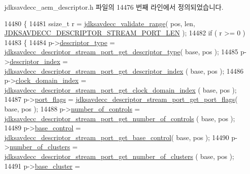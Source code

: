 jdksavdecc\+\_\+aem\+\_\+descriptor.\+h 파일의 14476 번째 라인에서 정의되었습니다.


\begin{DoxyCode}
14480 \{
14481     ssize\_t r = \hyperlink{group__util_ga9c02bdfe76c69163647c3196db7a73a1}{jdksavdecc\_validate\_range}( pos, len, 
      \hyperlink{group__descriptor__stream__port_ga1b3e49096f01beb5bfac0e22093adc0b}{JDKSAVDECC\_DESCRIPTOR\_STREAM\_PORT\_LEN} );
14482     \textcolor{keywordflow}{if} ( r >= 0 )
14483     \{
14484         p->\hyperlink{structjdksavdecc__descriptor__stream__port_ab7c32b6c7131c13d4ea3b7ee2f09b78d}{descriptor\_type} = 
      \hyperlink{group__descriptor__stream__port_ga9e5c5bfcfc4ac7f6ed5fbc306ae64397}{jdksavdecc\_descriptor\_stream\_port\_get\_descriptor\_type}(
       base, pos );
14485         p->\hyperlink{structjdksavdecc__descriptor__stream__port_a042bbc76d835b82d27c1932431ee38d4}{descriptor\_index} = 
      \hyperlink{group__descriptor__stream__port_ga7676ebd6ce26b6ef2d09bb93007f7c53}{jdksavdecc\_descriptor\_stream\_port\_get\_descriptor\_index}
      ( base, pos );
14486         p->\hyperlink{structjdksavdecc__descriptor__stream__port_a6608f023d147b556a49527d568abed8e}{clock\_domain\_index} = 
      \hyperlink{group__descriptor__stream__port_gaaf86a219e03309d42d2037bc17edd4bf}{jdksavdecc\_descriptor\_stream\_port\_get\_clock\_domain\_index}
      ( base, pos );
14487         p->\hyperlink{structjdksavdecc__descriptor__stream__port_a60a1f1704542df3b3f6e6db56622ddd9}{port\_flags} = 
      \hyperlink{group__descriptor__stream__port_ga95f34b2f9da40d90ee1b5b7fcda8403f}{jdksavdecc\_descriptor\_stream\_port\_get\_port\_flags}( base, pos
       );
14488         p->\hyperlink{structjdksavdecc__descriptor__stream__port_a0104bea638bdadf1a547c2b93813e22f}{number\_of\_controls} = 
      \hyperlink{group__descriptor__stream__port_ga125ba5e5a6d39ff2552d9289f5c44839}{jdksavdecc\_descriptor\_stream\_port\_get\_number\_of\_controls}
      ( base, pos );
14489         p->\hyperlink{structjdksavdecc__descriptor__stream__port_af06eac7dd98377a85258308e8a25e7f2}{base\_control} = 
      \hyperlink{group__descriptor__stream__port_ga75cb0d52e8f2b03cf7de1562dd1b98df}{jdksavdecc\_descriptor\_stream\_port\_get\_base\_control}( base,
       pos );
14490         p->\hyperlink{structjdksavdecc__descriptor__stream__port_a4e1eccd0b455e87131e38deaa98b7a7d}{number\_of\_clusters} = 
      \hyperlink{group__descriptor__stream__port_ga038db49f6e97689c7b549b6575c72593}{jdksavdecc\_descriptor\_stream\_port\_get\_number\_of\_clusters}
      ( base, pos );
14491         p->\hyperlink{structjdksavdecc__descriptor__stream__port_a27affef7a010ca4446501e50e8d4bc92}{base\_cluster} = 

\end{DoxyCode}
